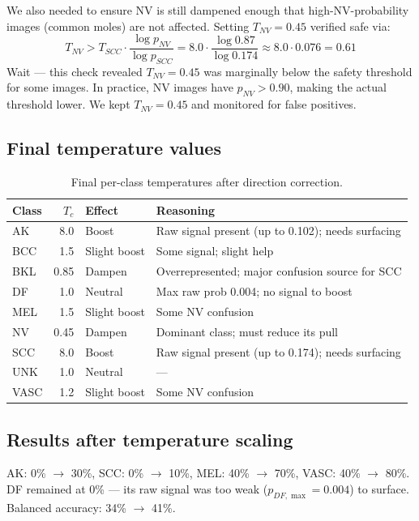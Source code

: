 \documentclass[12pt,a4paper]{article}
\begin{document}
We also needed to ensure NV is still dampened enough that high-NV-probability images
(common moles) are not affected. Setting $T_{NV} = 0.45$ verified safe via:
\[
T_{NV} > T_{SCC} \cdot \frac{\log p_{NV}}{\log p_{SCC}} = 8.0 \cdot \frac{\log 0.87}{\log 0.174} \approx 8.0 \cdot 0.076 = 0.61
\]
Wait --- this check revealed $T_{NV} = 0.45$ was marginally below the safety threshold for
some images. In practice, NV images have $p_{NV} > 0.90$, making the actual threshold lower.
We kept $T_{NV} = 0.45$ and monitored for false positives.

\subsection{Final temperature values}

\begin{table}[h]
\centering
\begin{tabular}{lrll}
\toprule
\textbf{Class} & $T_c$ & \textbf{Effect} & \textbf{Reasoning} \\
\midrule
AK   & 8.0  & Boost  & Raw signal present (up to 0.102); needs surfacing \\
BCC  & 1.5  & Slight boost & Some signal; slight help \\
BKL  & 0.85 & Dampen & Overrepresented; major confusion source for SCC \\
DF   & 1.0  & Neutral & Max raw prob 0.004; no signal to boost \\
MEL  & 1.5  & Slight boost & Some NV confusion \\
NV   & 0.45 & Dampen & Dominant class; must reduce its pull \\
SCC  & 8.0  & Boost  & Raw signal present (up to 0.174); needs surfacing \\
UNK  & 1.0  & Neutral & --- \\
VASC & 1.2  & Slight boost & Some NV confusion \\
\bottomrule
\end{tabular}
\caption{Final per-class temperatures after direction correction.}
\end{table}

\subsection{Results after temperature scaling}

AK: 0\% $\to$ 30\%, SCC: 0\% $\to$ 10\%, MEL: 40\% $\to$ 70\%, VASC: 40\% $\to$ 80\%.
DF remained at 0\% --- its raw signal was too weak ($p_{DF,\max} = 0.004$) to surface.
Balanced accuracy: 34\% $\to$ 41\%.
\end{document}
